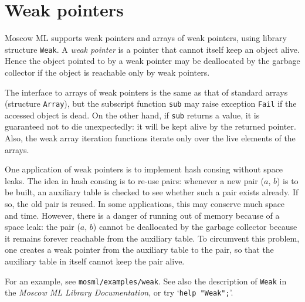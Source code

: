 \documentclass[fleqn,a4paper]{article}
\begin{document}

\newpage


\section{Weak pointers}
\label{sec-weak-pointers}

Moscow ML supports weak pointers and arrays of weak pointers, using
library structure {\tt Weak}.  A {\em weak pointer\/} is a pointer
that cannot itself keep an object alive.  Hence the object pointed to
by a weak pointer may be deallocated by the garbage collector if the
object is reachable only by weak pointers.

The interface to arrays of weak pointers is the same as that of
standard arrays (structure {\tt Array}), but the subscript function
{\tt sub} may raise exception {\tt Fail} if the accessed object is
dead.  On the other hand, if {\tt sub} returns a value, it is
guaranteed not to die unexpectedly: it will be kept alive by the
returned pointer.  Also, the weak array iteration functions iterate
only over the live elements of the arrays.

One application of weak pointers is to implement hash consing without
space leaks.  The idea in hash consing is to re-use pairs: whenever a
new pair ($a$, $b$) is to be built, an auxiliary table is checked to
see whether such a pair exists already.  If so, the old pair is
reused.  In some applications, this may conserve much space and time.
However, there is a danger of running out of memory because of a space
leak: the pair ($a$, $b$) cannot be deallocated by the garbage
collector because it remains forever reachable from the auxiliary
table.  To circumvent this problem, one creates a weak pointer from
the auxiliary table to the pair, so that the auxiliary table in itself
cannot keep the pair alive.

For an example, see {\tt mosml/examples/weak}.  See also the
description of {\tt Weak} in the \emph{Moscow ML Library
  Documentation}, or try `{\tt help "Weak";}'.
\end{document}

